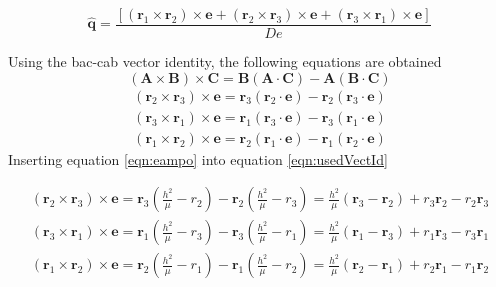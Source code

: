 \documentclass[12pt]{article}
\begin{document}
	\begin{equation}
	\hat { \mathbf { q } } = \frac { \left[ \left( \mathbf { r } _ { 1 } \times \mathbf { r } _ { 2 } \right) \times \mathbf { e } + \left( \mathbf { r } _ { 2 } \times \mathbf { r } _ { 3 } \right) \times \mathbf { e } + \left( \mathbf { r } _ { 3 } \times \mathbf { r } _ { 1 } \right) \times \mathbf { e } \right] } { D e } 
	\end{equation}
	
	Using the bac-cab vector identity, the following equations are obtained
	\begin{equation}
	( \mathbf { A } \times \mathbf { B } ) \times \mathbf { C }  = \mathbf { B } ( \mathbf { A } \cdot \mathbf { C } ) - \mathbf { A } ( \mathbf { B } \cdot \mathbf { C } )
	\end{equation}
	\begin{eqnarray}
	{ \left( \mathbf { r } _ { 2 } \times \mathbf { r } _ { 3 } \right) \times \mathbf { e } = \mathbf { r } _ { 3 } \left( \mathbf { r } _ { 2 } \cdot \mathbf { e } \right) - \mathbf { r } _ { 2 } \left( \mathbf { r } _ { 3 } \cdot \mathbf { e } \right) } \\ { \left( \mathbf { r } _ { 3 } \times \mathbf { r } _ { 1 } \right) \times \mathbf { e } = \mathbf { r } _ { 1 } \left( \mathbf { r } _ { 3 } \cdot \mathbf { e } \right) - \mathbf { r } _ { 3 } \left( \mathbf { r } _ { 1 } \cdot \mathbf { e } \right) } \\ { \left( \mathbf { r } _ { 1 } \times \mathbf { r } _ { 2 } \right) \times \mathbf { e } = \mathbf { r } _ { 2 } \left( \mathbf { r } _ { 1 } \cdot \mathbf { e } \right) - \mathbf { r } _ { 1 } \left( \mathbf { r } _ { 2 } \cdot \mathbf { e } \right) } 
	\label{eqn:usedVectId}
	\end{eqnarray}
	Inserting equation \ref{eqn:eampo} into equation \ref{eqn:usedVectId}  
	
	\begin{eqnarray}
	\left( \mathbf { r } _ { 2 } \times \mathbf { r } _ { 3 } \right) \times \mathbf { e } = \mathbf { r } _ { 3 } \left( \frac { h ^ { 2 } } { \mu } - r _ { 2 } \right) - \mathbf { r } _ { 2 } \left( \frac { h ^ { 2 } } { \mu } - r _ { 3 } \right) = \frac { h ^ { 2 } } { \mu } \left( \mathbf { r } _ { 3 } - \mathbf { r } _ { 2 } \right) + r _ { 3 } \mathbf { r } _ { 2 } - r _ { 2 } \mathbf { r } _ { 3 }\\
	\left( \mathbf { r } _ { 3 } \times \mathbf { r } _ { 1 } \right) \times \mathbf { e } = \mathbf { r } _ { 1 } \left( \frac { h ^ { 2 } } { \mu } - r _ { 3 } \right) - \mathbf { r } _ { 3 } \left( \frac { h ^ { 2 } } { \mu } - r _ { 1 } \right) = \frac { h ^ { 2 } } { \mu } \left( \mathbf { r } _ { 1 } - \mathbf { r } _ { 3 } \right) + r _ { 1 } \mathbf { r } _ { 3 } - r _ { 3 } \mathbf { r } _ { 1 }\\
	\left( \mathbf { r } _ { 1 } \times \mathbf { r } _ { 2 } \right) \times \mathbf { e } = \mathbf { r } _ { 2 } \left( \frac { h ^ { 2 } } { \mu } - r _ { 1 } \right) - \mathbf { r } _ { 1 } \left( \frac { h ^ { 2 } } { \mu } - r _ { 2 } \right) = \frac { h ^ { 2 } } { \mu } \left( \mathbf { r } _ { 2 } - \mathbf { r } _ { 1 } \right) + r _ { 2 } \mathbf { r } _ { 1 } - r _ { 1 } \mathbf { r } _ { 2 }
	\end{eqnarray}
	
\end{document}
